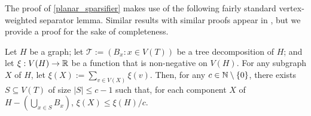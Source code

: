 \documentclass{patmorin}
\renewcommand{\ge}{\geqslant}
\renewcommand{\le}{\leqslant}
\renewcommand{\geq}{\geqslant}
\begin{document}



The proof of \cref{planar_sparsifier} makes use of the following fairly standard vertex-weighted separator lemma.  Similar results with similar proofs appear in  \citet{robertson.seymour:graph}, but we provide a proof for the sake of completeness.


\begin{lem}\label{weighted_separator}
    Let $H$ be a graph; let $\mathcal{T}:=(B_x:x\in V(T))$ be a tree decomposition of $H$; and let $\xi:V(H)\to\mathbb{R}$ be a function that is non-negative on $V(H)$.  For any subgraph $X$ of $H$, let  $\xi(X):=\sum_{v\in V(X)} \xi(v)$.
    Then, for any $c\in\mathbb{N}\setminus\{0\}$, there exists $S\subseteq V(T)$ of size $|S|\le c-1$ such that, for each component $X$ of $H-(\bigcup_{x\in S} B_x)$, $\xi(X)\le \xi(H)/c$.
\end{lem}
\end{document}
